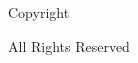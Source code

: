 \newpage
\thispagestyle{empty}

\hspace{0pt}
\vfill
\begin{nscenter} Copyright \textcopyright\ \theAuthor\ \conferredYear \par All Rights Reserved \end{nscenter}
\vfill
\hspace{0pt}